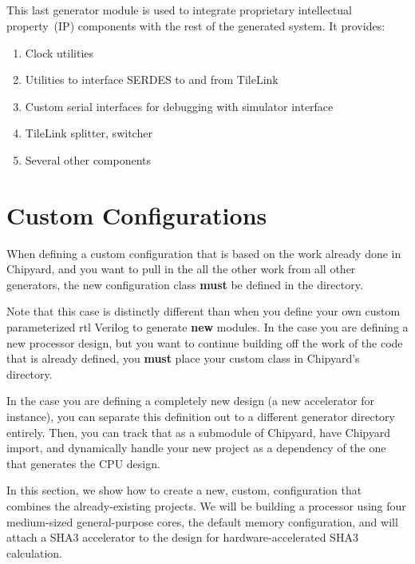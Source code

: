 \subsection{}\label{sec:testchipip}
\nocite{testchipipGithub}
This last generator module is used to integrate proprietary intellectual property~(IP) components with the rest of the generated system.
It provides:
\begin{enumerate}
\item Clock utilities
\item Utilities to interface SERDES to and from TileLink
\item Custom serial interfaces for debugging with simulator interface
\item TileLink splitter, switcher
\item Several other components
\end{enumerate}

\section{Custom Configurations}\label{sec:Custom_Configurations}
When defining a custom configuration that is based on the work already done in Chipyard, and you want to pull in the all the other work from all other generators, the new configuration class \textbf{must} be defined in the  directory.

\begin{blackbox}
  Note that this case is distinctly different than when you define your own custom parameterized \gls{rtl} Verilog to generate \textbf{new} modules.
  In the case you are defining a new processor design, but you want to continue building off the work of the code that is already defined, you \textbf{must} place your custom class in Chipyard's  directory.

  In the case you are defining a completely new design (a new accelerator for instance), you can separate this definition out to a different generator directory entirely.
  Then, you can track that as a submodule of Chipyard, have Chipyard import, and dynamically handle your new project as a dependency of the one that generates the CPU design.
\end{blackbox}

In this section, we show how to create a new, custom, configuration that combines the already-existing projects.
We will be building a processor using four medium-sized  general-purpose cores, the default memory configuration, and will attach a SHA3 accelerator to the design for hardware-accelerated SHA3 calculation.


